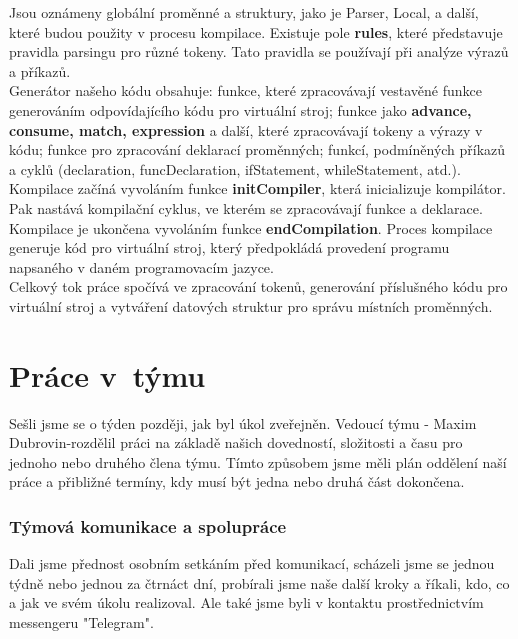\documentclass[a4paper, 11pt]{article}
\begin{document}
        Jsou oznámeny globální proměnné a struktury, jako je Parser, Local, a další, které budou použity v procesu kompilace. Existuje pole \textbf{rules}, které představuje pravidla parsingu pro různé tokeny. Tato pravidla se používají při analýze výrazů a příkazů.\\
        Generátor našeho kódu obsahuje: funkce, které zpracovávají vestavěné funkce generováním odpovídajícího kódu pro virtuální stroj; funkce jako \textbf{advance, consume, match, expression} a další, které zpracovávají tokeny a výrazy v kódu; funkce pro zpracování deklarací proměnných; funkcí, podmíněných příkazů a cyklů (declaration, funcDeclaration, ifStatement, whileStatement, atd.).\\
        Kompilace začíná vyvoláním funkce \textbf{initCompiler}, která inicializuje kompilátor. Pak nastává kompilační cyklus, ve kterém se zpracovávají funkce a deklarace.
        Kompilace je ukončena vyvoláním funkce \textbf{endCompilation}.
        Proces kompilace generuje kód pro virtuální stroj, který předpokládá provedení programu napsaného v daném programovacím jazyce.\\

        
        Celkový tok práce spočívá ve zpracování tokenů, generování příslušného kódu pro virtuální stroj a vytváření datových struktur pro správu místních proměnných.


	\section{Práce v~týmu}

        Sešli jsme se o týden později, jak byl úkol zveřejněn. Vedoucí týmu - Maxim Dubrovin-rozdělil práci na základě našich dovedností, složitosti a času pro jednoho nebo druhého člena týmu. Tímto způsobem jsme měli plán oddělení naší práce a přibližné termíny, kdy musí být jedna nebo druhá část dokončena.

	\subsubsection{Týmová komunikace a spolupráce}

        Dali jsme přednost osobním setkáním před komunikací, scházeli jsme se jednou týdně nebo jednou za čtrnáct dní, probírali jsme naše další kroky a říkali, kdo, co a jak ve svém úkolu realizoval. Ale také jsme byli v kontaktu prostřednictvím messengeru "Telegram".
        \\
        
\end{document}
